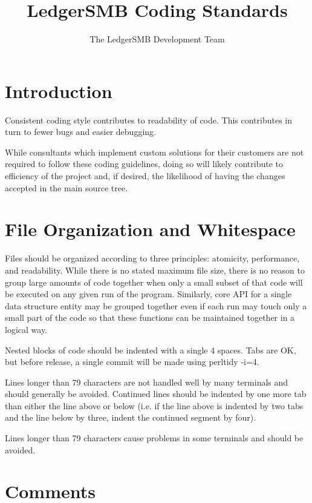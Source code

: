 \documentclass{article}
\title{LedgerSMB Coding Standards}
\author{The LedgerSMB Development Team}
\begin{document}
\maketitle

\tableofcontents

\section{Introduction}
Consistent coding style contributes to readability of code.  This contributes in
turn to fewer bugs and easier debugging.

While consultants which implement custom solutions for their customers are not
required to follow these coding guidelines, doing so will likely contribute to
efficiency of the project and, if desired, the likelihood of having the changes
accepted in the main source tree.

\section{File Organization and Whitespace}

Files should be organized according to three principles: atomicity, performance,
and readability.  While there is no stated maximum file size, there is no reason to
group large amounts of code together when only a small subset of that code will
be executed on any given run of the program.  Similarly, core API for a single
data structure entity may be grouped together even if each run may touch only a
small part of the code so that these functions can be maintained together in a
logical way.

Nested blocks of code should be indented with a single 4 spaces.  Tabs are OK, 
but before release, a single commit will be made using perltidy -i=4.  

Lines longer than 79 characters are not handled well by many terminals and
should generally be avoided.  Continued lines should be indented by one more tab
than either the line above or below (i.e. if the line above is indented by two
tabs and the line below by three, indent the continued segment by four).

Lines longer than 79 characters cause problems in some terminals and should be
avoided.

\section{Comments}
\end{document}
